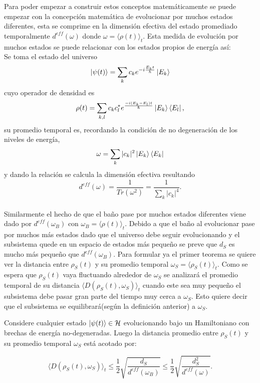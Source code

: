 Para poder empezar a construir estos conceptos matemáticamente se puede empezar con la concepción matemática de evolucionar por muchos estados diferentes, esta se comprime en la dimensión efectiva del estado promediado temporalmente $d^{eff}(\omega)$ donde $\omega= \big \langle \rho(t) \big\rangle_{t}$. Esta medida de evolución por muchos estados se puede relacionar con los estados propios de energía así:
\\
Se toma el estado del universo
\begin{equation}
\ket{\psi(t)} = \sum_{k} c_{k} e^{-i\frac{E_{k}t}{\hbar}} \ket{E_{k}}
\end{equation}
cuyo operador de densidad es 
\begin{equation}
\rho(t)=\sum_{k,l} c_{k} c_{l}^{*} e^{\frac{-i(E_{k}-E_{l})t}{\hbar}}\ket{E_{k}} \bra{E_{l}},
\end{equation}
su promedio temporal es, recordando la condición de no degeneración de los niveles de energía,
\begin{equation}
\omega= \sum_{k} |c_{k}|^{2} \ket{E_{k}} \bra{E_{k}}
\end{equation}
y dando la relación se calcula la dimensión efectiva resultando 
\begin{equation}
d^{eff}(\omega)=\frac{1}{Tr(\omega^{2})}=\frac{1}{\sum_{k} |c_{k}|^{4} }.
\end{equation}
\\
Similarmente el hecho de que el baño pase por muchos estados diferentes viene dado por $d^{eff}(\omega_{B})$ con $\omega_{B}=\langle \rho(t) \rangle_{t}$. Debido a que el baño al evolucionar pase por muchos más estados dado que el universo debe seguir evolucionando y el subsistema quede en un espacio de estados más pequeño se preve que $d_{S}$ es mucho más pequeño que $d^{eff}(\omega_{B})$. Para formular ya el primer teorema se quiere ver la distancia entre $\rho_{S}(t)$ y su promedio temporal $\omega_{S}= \langle \rho_{S}(t) \rangle_{t}$. Como se espera que $\rho_{S}(t) $ vaya fluctuando alrededor de $\omega_{S}$ se analizará el promedio temporal de su distancia $\langle D(\rho_{S}(t) ,\omega_{S}) \rangle_{t}$ cuando este sea muy pequeño el subsistema debe pasar gran parte del tiempo muy cerca a $\omega_{S}$. Esto quiere decir que el subsistema se equilibrará(según la definición anterior) a $\omega_{S}$.

\begin{theorem} \label{equlibracion}

Considere cualquier estado $\ket{\psi(t)} \in \mathcal{H}$ evolucionando bajo un Hamiltoniano con brechas de energía no-degeneradas. Luego la distancia promedio entre $\rho_{S}(t)$ y su promedio temporal $\omega_{S}$ está acotado por:

\begin{equation}
\langle D(\rho_{S}(t) ,\omega_{S}) \rangle_{t} \le \frac{1}{2} \sqrt{\frac{d_{S}}{d^{eff}(\omega_{B})}} \le \frac{1}{2} \sqrt{\frac{d_{S}^{2}}{d^{eff}(\omega)}}.
\end{equation}
\end{theorem}

